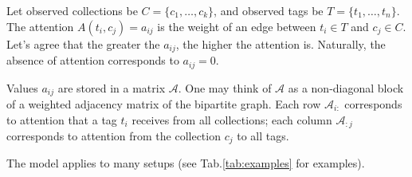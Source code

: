 
Let observed collections be $C = \{c_1, \dots, c_k\}$, and observed tags be $T = \{t_1, \dots, t_n\}$.
The attention $A(t_i, c_j) = a_{ij}$ is the weight of an edge between $t_i \in T$ and $c_j \in C$.
Let's agree that the greater the $a_{ij}$, the higher the attention is. Naturally, the absence of attention corresponds to $a_{ij} = 0$. 

Values $a_{ij}$ are stored in a matrix $\mathcal{A}$. One may think of $\mathcal{A}$ as a non-diagonal block of a weighted adjacency matrix of the bipartite graph. Each row $\mathcal{A}_{i:}$ corresponds to attention that a tag $t_i$ receives from all collections; each column $\mathcal{A}_{:j}$ corresponds to attention from the collection $c_j$ to all tags.


The model applies to many setups (see Tab.\ref{tab:examples} for examples).

